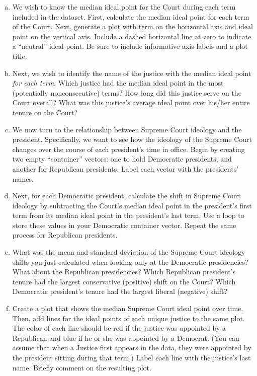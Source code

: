 \documentclass[11pt]{article}
\begin{document}
\begin{enumerate}[a.]
\item We wish to know the median ideal point for the Court during each
  term included in the dataset. First, calculate the median ideal point
  for each term of the Court. Next, generate a plot
  with term on the horizontal axis and ideal point on the vertical axis. 
  Include a dashed horizontal line at zero to indicate a ``neutral''
  ideal point. Be sure to include informative axis labels
  and a plot title.
\item Next, we wish to identify the name of the justice
  with the median ideal point \textit{for each term}. Which justice had the median
  ideal point in the most (potentially
  nonconsecutive) terms? How long did this justice serve on the Court overall?
  What was this justice's average ideal point over his/her entire
  tenure on the Court?
\item  We now turn to the relationship between Supreme Court
  ideology and the president. Specifically, we want to see how
  the ideology of the Supreme Court changes over the course of each president's
  time in office. Begin by creating two empty
  ``container'' vectors: one to hold Democratic presidents, 
  and another for Republican presidents. Label each vector with the presidents' names.
\item Next, for each Democratic president, calculate the shift in Supreme
  Court ideology by subtracting the Court's median ideal point in the 
  president's first term from its median ideal point in the president's last
  term. Use a loop to store these values in your Democratic container vector. 
  Repeat the same process for Republican presidents.
\item What was the mean and standard deviation of the Supreme Court
  ideology shifts you just calculated when looking only at the 
  Democratic presidencies? What about the Republican presidencies?
  Which Republican president's tenure had the largest conservative 
  (positive) shift on the Court? Which Democratic president's tenure
  had the largest liberal (negative) shift? 
\item Create a plot that shows the median Supreme Court ideal point
  over time.  Then, add lines for the ideal points of each unique justice
  to the same plot. The color of each line should be red if the 
  justice was appointed by a Republican and blue if he or she was appointed
  by a Democrat. (You can assume that when a Justice first appears in the 
  data, they were appointed by the president sitting during that term.)
  Label each line with the justice's last name.  Briefly comment on the
  resulting plot.  
\end{enumerate}
\end{document}
